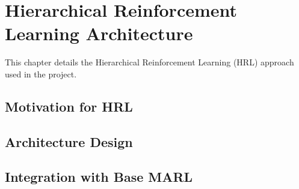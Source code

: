 \section{Hierarchical Reinforcement Learning Architecture}
\label{ch:hrl_architecture}

This chapter details the Hierarchical Reinforcement Learning (HRL) approach used in the project.

\subsection{Motivation for HRL}

\subsection{Architecture Design}

\subsection{Integration with Base MARL}
